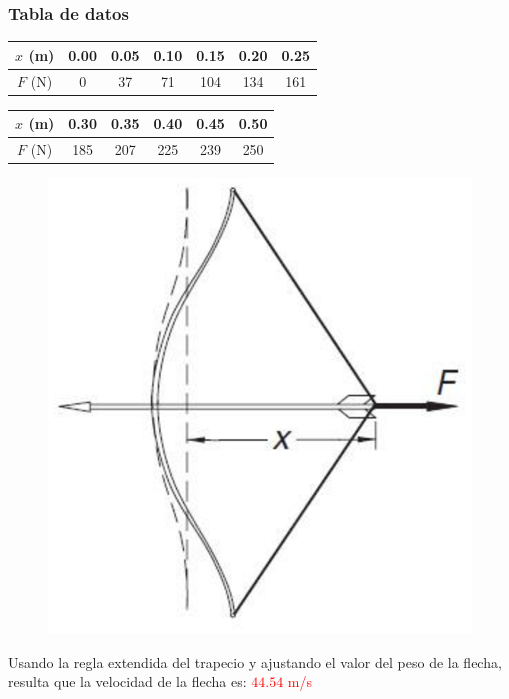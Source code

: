 \begin{frame}[fragile]
\frametitle{Tabla de datos}
\begin{center}
\begin{tabular}{c | c | c | c | c | c | c |}
$x$ (m) & 0.00 & 0.05 & 0.10 & 0.15 & 0.20 & 0.25  \\ \hline
$F$ (N)  & 0 & 37 & 71 & 104 & 134 & 161
\end{tabular}
\end{center}
\begin{center}
\begin{tabular}{c | c | c | c | c | c | }
$x$ (m) & 0.30 & 0.35 & 0.40 & 0.45 & 0.50 \\ \hline
$F$ (N)  & 185 & 207 & 225 & 239 & 250 
\end{tabular}
\end{center}
\begin{figure}
\centering
\includegraphics[scale=0.4]{Imagenes/Integral_01_Arco.eps} 
\end{figure}
\end{frame}
\begin{frame}[fragile]
Usando la regla extendida del trapecio y ajustando el valor del peso de la flecha, resulta que la velocidad de la flecha es: \textcolor{red}{$44.54$ m/s}
\end{frame}
